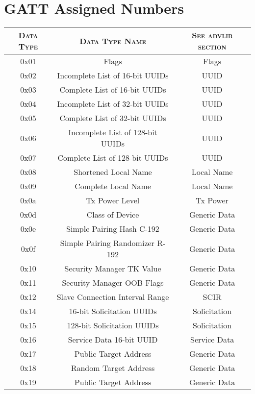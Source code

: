 \chapter{GATT Assigned Numbers}
\label{appendixA}
\thispagestyle{empty}

\begin{longtable}{c c c} 
	\hline
		\textsc{Data Type} &	\textsc{Data Type Name} & \textsc{See advlib section} \\ \hline
		 0x01 &	Flags &	Flags \\ \hline
		 0x02 &	Incomplete List of 16-bit UUIDs &	UUID \\ \hline
		 0x03 &	Complete List of 16-bit UUIDs &	UUID \\ \hline
		 0x04 &	Incomplete List of 32-bit UUIDs &	UUID \\ \hline
		 0x05 &	Complete List of 32-bit UUIDs &	UUID \\ \hline
		 0x06 &	Incomplete List of 128-bit UUIDs &	UUID \\ \hline
		 0x07 &	Complete List of 128-bit UUIDs &	UUID \\ \hline
		 0x08 &	Shortened Local Name &	Local Name \\ \hline
		 0x09 &	Complete Local Name &	Local Name \\ \hline
		 0x0a &	Tx Power Level &	Tx Power \\ \hline
		 0x0d &	Class of Device &	Generic Data \\ \hline
		 0x0e &	Simple Pairing Hash C-192 &	Generic Data \\ \hline
		 0x0f &	Simple Pairing Randomizer R-192 &	Generic Data \\ \hline
		 0x10 &	Security Manager TK Value &	Generic Data \\ \hline
		 0x11 &	Security Manager OOB Flags &	Generic Data \\ \hline
		 0x12 &	Slave Connection Interval Range &	SCIR \\ \hline
		 0x14 &	16-bit Solicitation UUIDs &	Solicitation \\ \hline
		 0x15 &	128-bit Solicitation UUIDs &	Solicitation \\ \hline
		 0x16 &	Service Data 16-bit UUID &	Service Data \\ \hline
		 0x17 &	Public Target Address &	Generic Data \\ \hline
		 0x18 &	Random Target Address &	Generic Data \\ \hline
		 0x19 &	Public Target Address &	Generic Data \\ \hline

\end{longtable}
